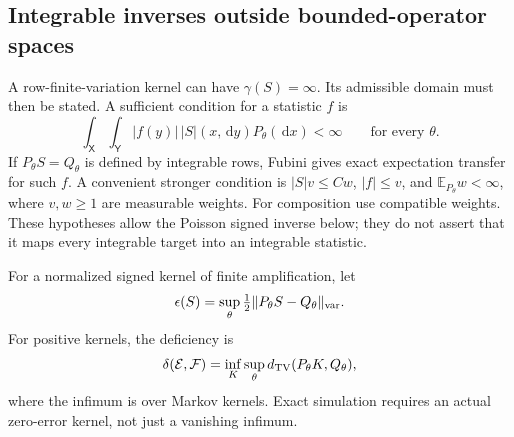 \documentclass[11pt]{article}
\numberwithin{equation}{section}
\theoremstyle{definition}
\theoremstyle{remark}
\newcommand{\E}{\mathbb E}\newcommand{\Pp}{\mathbb P}\newcommand{\R}{\mathbb R}\newcommand{\N}{\mathbb N}
\newcommand{\dd}{\,\mathrm d}\newcommand{\norm}[1]{\left\lVert#1\right\rVert}\newcommand{\Scal}{\mathsf S}\newcommand{\Tcal}{\mathsf T}
\begin{document}
\subsection{Integrable inverses outside bounded-operator spaces}
A row-finite-variation kernel can have $\gamma(S)=\infty$. Its admissible domain must then be stated. A sufficient condition for a statistic $f$ is
\begin{equation}\label{eq:domain}
 \int_{\mathsf X}\int_{\mathsf Y}|f(y)|\,|S|(x,\dd y)P_\theta(\dd x)<\infty
 \qquad\text{for every }\theta.
\end{equation}
If $P_\theta S=Q_\theta$ is defined by integrable rows, Fubini gives exact expectation transfer for such $f$. A convenient stronger condition is $|S|v\le Cw$, $|f|\le v$, and $\E_{P_\theta}w<\infty$, where $v,w\ge1$ are measurable weights. For composition use compatible weights. These hypotheses allow the Poisson signed inverse below; they do not assert that it maps every integrable target into an integrable statistic.

\begin{definition}
For a normalized signed kernel of finite amplification, let
\[
 \epsilon(S)=\sup_\theta \tfrac12\|P_\theta S-Q_\theta\|_{\rm var}.
\]
For positive kernels, the deficiency is
\begin{equation}\label{eq:deficiency}
 \delta(\mathcal E,\mathcal F)=\inf_K\sup_\theta d_{\rm TV}(P_\theta K,Q_\theta),
\end{equation}
where the infimum is over Markov kernels. Exact simulation requires an actual zero-error kernel, not just a vanishing infimum.
\end{definition}
\end{document}
